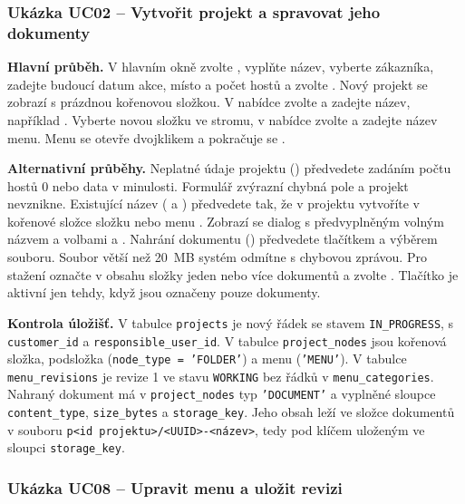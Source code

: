 \subsubsection{Ukázka UC02 -- Vytvořit projekt a spravovat jeho dokumenty}

\textbf{Hlavní průběh.} V hlavním okně zvolte , vyplňte název, vyberte zákazníka, zadejte budoucí datum akce, místo a počet hostů a zvolte . Nový projekt se zobrazí s prázdnou kořenovou složkou. V nabídce  zvolte  a zadejte název, například . Vyberte novou složku ve stromu, v nabídce  zvolte  a zadejte název menu. Menu se otevře dvojklikem a pokračuje se .

\textbf{Alternativní průběhy.} Neplatné údaje projektu () předvedete zadáním počtu hostů 0 nebo data v minulosti. Formulář zvýrazní chybná pole a projekt nevznikne. Existující název ( a ) předvedete tak, že v projektu  vytvoříte v kořenové složce složku  nebo menu . Zobrazí se dialog  s předvyplněným volným názvem a volbami  a . Nahrání dokumentu () předvedete tlačítkem  a výběrem souboru. Soubor větší než 20~MB systém odmítne s chybovou zprávou. Pro stažení označte v obsahu složky jeden nebo více dokumentů a zvolte . Tlačítko je aktivní jen tehdy, když jsou označeny pouze dokumenty.

\textbf{Kontrola úložišť.} V tabulce \texttt{projects} je nový řádek se stavem \texttt{IN\_PROGRESS}, s \texttt{customer\_id} a \texttt{responsible\_user\_id}. V tabulce \texttt{project\_nodes} jsou kořenová složka, podsložka (\texttt{node\_type = 'FOLDER'}) a menu (\texttt{'MENU'}). V tabulce \texttt{menu\_revisions} je revize 1 ve stavu \texttt{WORKING} bez řádků v \texttt{menu\_categories}. Nahraný dokument má v \texttt{project\_nodes} typ \texttt{'DOCUMENT'} a vyplněné sloupce \texttt{content\_type}, \texttt{size\_bytes} a \texttt{storage\_key}. Jeho obsah leží ve složce dokumentů v souboru \texttt{p<id projektu>/<UUID>-<název>}, tedy pod klíčem uloženým ve sloupci \texttt{storage\_key}.

\subsubsection{Ukázka UC08 -- Upravit menu a uložit revizi}

